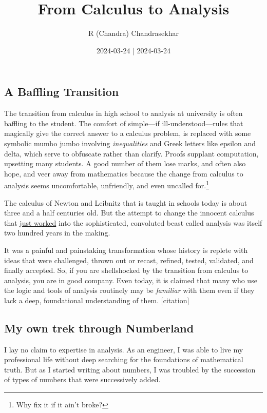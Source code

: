 \documentclass[
  a4paper,
]{article}
\title{From Calculus to Analysis}
\author{R (Chandra) Chandrasekhar}
\date{2024-03-24 | 2024-03-24}
\begin{document}
\maketitle

\thispagestyle{empty}


\subsection{A Baffling Transition}\label{a-baffling-transition}

The transition from calculus in high school to analysis at university is
often baffling to the student. The comfort of simple---if
ill-understood---rules that magically give the correct answer to a
calculus problem, is replaced with some symbolic mumbo jumbo involving
\emph{inequalities} and Greek letters like epsilon and delta, which
serve to obfuscate rather than clarify. Proofs supplant computation,
upsetting many students. A good number of them lose marks, and often
also hope, and veer away from mathematics because the change from
calculus to analysis seems uncomfortable, unfriendly, and even uncalled
for.\footnote{Why fix it if it ain't broke?}

The calculus of Newton and Leibnitz that is taught in schools today is
about three and a half centuries old. But the attempt to change the
innocent calculus that \href{}{just worked} into the sophisticated,
convoluted beast called analysis was itself two hundred years in the
making.

It was a painful and painstaking transformation whose history is replete
with ideas that were challenged, thrown out or recast, refined, tested,
validated, and finally accepted. So, if you are shellshocked by the
transition from calculus to analysis, you are in good company. Even
today, it is claimed that many who use the logic and tools of analysis
routinely may be \emph{familiar} with them even if they lack a deep,
foundational understanding of them. {[}citation{]}

\subsection{My own trek through
Numberland}\label{my-own-trek-through-numberland}

I lay no claim to expertise in analysis. As an engineer, I was able to
live my professional life without deep searching for the foundations of
mathematical truth. But as I started writing about numbers, I was
troubled by the succession of types of numbers that were successively
added.
\end{document}
